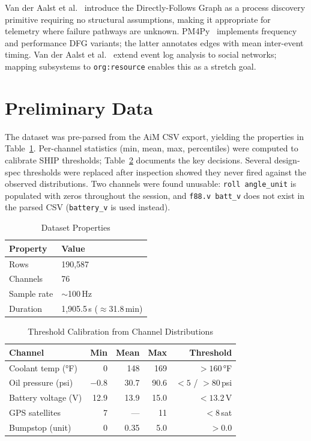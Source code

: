 \documentclass[14pt]{extarticle}
\begin{document}
Van der Aalst et al.~\cite{vanderaalst2004} introduce the Directly-Follows Graph as a process discovery primitive requiring no structural assumptions, making it appropriate for telemetry where failure pathways are unknown. PM4Py~\cite{berti2019} implements frequency and performance DFG variants; the latter annotates edges with mean inter-event timing. Van der Aalst et al.~\cite{vanderaalst2005} extend event log analysis to social networks; mapping subsystems to \texttt{org:resource} enables this as a stretch goal.

\section{Preliminary Data}

The dataset was pre-parsed from the AiM CSV export, yielding the properties in Table~\ref{tab:dataset}. Per-channel statistics (min, mean, max, percentiles) were computed to calibrate SHIP thresholds; Table~\ref{tab:thresholds} documents the key decisions. Several design-spec thresholds were replaced after inspection showed they never fired against the observed distributions. Two channels were found unusable: \texttt{roll angle\_unit} is populated with zeros throughout the session, and \texttt{f88.v batt\_v} does not exist in the parsed CSV (\texttt{battery\_v} is used instead).

\begin{table}[H]
\centering
\caption{Dataset Properties}
\label{tab:dataset}
\begin{tabular}{ll}
\toprule
Property & Value \\
\midrule
Rows & 190,587 \\
Channels & 76 \\
Sample rate & $\sim$100\,Hz \\
Duration & 1,905.5\,s ($\approx$31.8\,min) \\
\bottomrule
\end{tabular}
\end{table}

\begin{table}[H]
\centering
\caption{Threshold Calibration from Channel Distributions}
\label{tab:thresholds}
\begin{tabular}{lrrrr}
\toprule
Channel & Min & Mean & Max & Threshold \\
\midrule
Coolant temp (°F)   & 0      & 148  & 169  & $>160$\,°F        \\
Oil pressure (psi)  & $-0.8$ & 30.7 & 90.6 & $<5$ / $>80$\,psi \\
Battery voltage (V) & 12.9   & 13.9 & 15.0 & $<13.2$\,V        \\
GPS satellites      & 7      & ---  & 11   & $<8$\,sat          \\
Bumpstop (unit)     & 0      & 0.35 & 5.0  & $>0.0$             \\
\bottomrule
\end{tabular}
\end{table}
\end{document}
